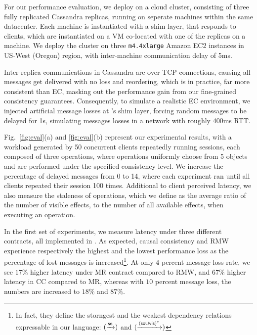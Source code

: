 For our performance evaluation, we deploy \tool on a cloud cluster,
consisting of three fully replicated Cassandra replicas, running on
seperate machines within the same
datacenter. 
Each machine is instantiated with a
\tool shim layer, that responds to clients,  
 which are instantiated on a VM 
co-located with one of the replicas on a machine.
We deploy the cluster on three \texttt{m4.4xlarge} Amazon EC2 instances
in US-West (Oregon) region, with inter-machine communication delay of 5ms.

Inter-replica communications in Cassandra are over TCP connections, 
causing all messages get delivered with no loss and reordering, which
is in practice, far  more consistent than EC, masking out the
performance gain from our fine-grained consistency guarantees.
Consequently, to simulate a
realistic EC environment, we injected artificial message losses at
\tool's shim layer, forcing random messages to be delayed for 1s,
simulating messages losses in a network with roughly 400ms RTT.

Fig.~\ref{fig:eval}(a) and \ref{fig:eval}(b) represent
our experimental results, with a workload generated 
by 50 concurrent clients repeatedly running sessions, each composed of three
operations, where operations uniformly choose from 5 objects and are
performed under the specified consistency level. 
We increase the
percentage of delayed messages from 0 to 14, where each experiment ran 
until all clients repeated their session 100 times. Additional to client perceived
latency, we also measure the staleness of operations, which we define as
the average ratio of the number of visible effects,
to the number of all available effects, when executing an operation.

In the first set of experiments, we measure latency under
three different \LB{} contracts, all implemented in \tool. As
expected,
causal consistency and RMW experience respectively the highest and the
lowest
performance loss as the percentage of lost messages is increased\footnote{In fact, 
they define the storngest and the weakest
\LB{} dependency relations expressable in our language:
$(\xrightarrow{{\textsf{so}}})$ and $(\xrightarrow{({\textsf{so}}\cup{\normalfont \textsf{vis}})^*})$}.
At only $4$ percent message loss rate, we see $17\%$ higher latency under MR
contract compared to RMW, and  $67\%$ higher latency in CC
compared to MR, whereas with $10$ percent message loss, the numbers are
increased to $18\%$ and $87\%$.


